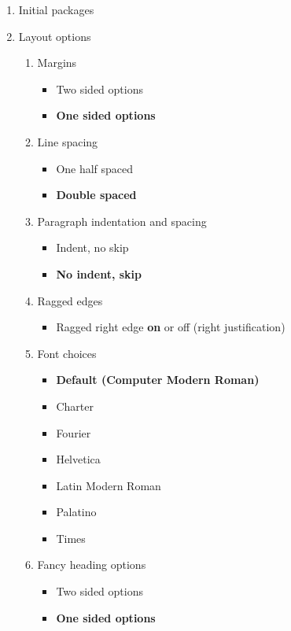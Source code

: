 \begin{enumerate}[\bf 1]
\item Initial packages

\item Layout options
\begin{enumerate}[2.1]
\item Margins
\begin{itemize}
\item Two sided options
\item \textbf{One sided options}
\end{itemize}
\item Line spacing
\begin{itemize}
\item One half spaced
\item \textbf{Double spaced}
\end{itemize}
\item Paragraph indentation and spacing
\begin{itemize}
\item Indent, no skip
\item \textbf{No indent, skip}
\end{itemize}
\item Ragged edges
\begin{itemize}
\item Ragged right edge \textbf{on} or off (right justification)
\end{itemize}
\item Font choices
\begin{itemize}
\item \textbf{Default (Computer Modern Roman)}
\item Charter
\item Fourier
\item Helvetica
\item Latin Modern Roman
\item Palatino
\item Times
\end{itemize}
\item Fancy heading options
\begin{itemize}
\item Two sided options
\item \textbf{One sided options}
\end{itemize}
\end{enumerate}


\end{enumerate}
